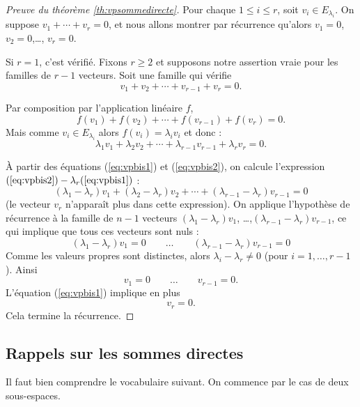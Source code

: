 \documentclass[12pt, class=report,crop=false]{standalone}
\begin{document}
\bigskip


\begin{proof}[Preuve du théorème \ref{th:vpsommedirecte}]
Pour chaque $1\le i\le r$, soit $v_i \in E_{\lambda_i}$. On suppose $v_1+\cdots+v_r=0$, et nous allons montrer
par récurrence qu'alors $v_1=0$, $v_2=0$,\ldots, $v_r=0$.

Si $r=1$, c'est vérifié. Fixons $r\ge2$ et supposons notre assertion vraie pour les familles de $r-1$ vecteurs.
Soit une famille qui vérifie 
\begin{equation}
\label{eq:vpbis1}
v_1 + v_2 +\cdots + v_{r-1} + v_r = 0.
\end{equation}


Par composition par l'application linéaire $f$,
$$f(v_1) + f(v_2) +\cdots + f(v_{r-1}) + f(v_r) = 0.$$
Mais comme $v_i \in E_{\lambda_i}$ alors $f(v_i)=\lambda_i v_i$ et donc :
\begin{equation}
\label{eq:vpbis2}
\lambda_1 v_1 + \lambda_2 v_2 +\cdots + \lambda_{r-1} v_{r-1} + \lambda_r v_r  = 0.
\end{equation}

\`A partir des équations (\ref{eq:vpbis1}) et (\ref{eq:vpbis2}), on calcule
l'expression $(\ref{eq:vpbis2}) - \lambda_r (\ref{eq:vpbis1})$ :
\begin{equation*}
\label{eq:vpbis3}
(\lambda_1-\lambda_r)  v_1 + (\lambda_2-\lambda_r) v_2 +\cdots + (\lambda_{r-1}-\lambda_{r}) v_{r-1} = 0
\end{equation*}
(le vecteur $v_r$ n'apparaît plus dans cette expression).
On applique l'hypothèse de récurrence à la famille de $n-1$ vecteurs $(\lambda_1-\lambda_r)  v_1$,
\ldots,$(\lambda_{r-1}-\lambda_{r}) v_{r-1}$, ce qui implique que tous ces vecteurs sont nuls :
$$(\lambda_1-\lambda_r)  v_1 = 0 \qquad \ldots \qquad (\lambda_{r-1}-\lambda_{r}) v_{r-1}=0$$
Comme les valeurs propres sont distinctes, alors $\lambda_i - \lambda_r \neq 0$ (pour $i=1,\ldots,r-1$).
Ainsi 
$$v_1  = 0 \qquad \ldots \qquad v_{r-1} =0.$$
L'équation (\ref{eq:vpbis1}) implique en plus
$$v_r = 0.$$
Cela termine la récurrence.
\end{proof}


\subsection{Rappels sur les sommes directes}
\label{ssec:rapsommesdirectes}


Il faut bien comprendre le vocabulaire suivant. On commence par le cas de deux sous-espaces.
\end{document}
